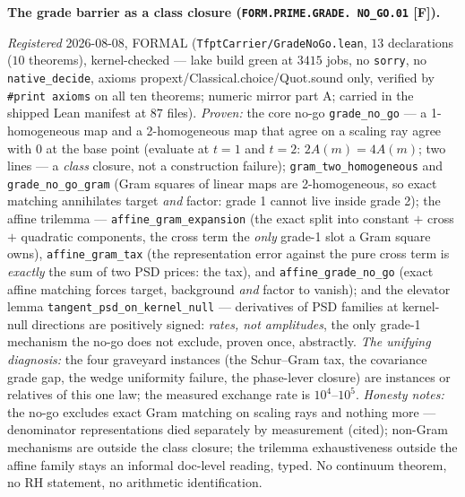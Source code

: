 \documentclass[11pt,a4paper]{article}
\begin{document}
\par\smallskip\noindent\textbf{The grade barrier as a class
closure (\texttt{FORM.PRIME.\allowbreak GRADE.\allowbreak
NO\_GO.01} [F]).}
{\sloppy
\emph{Registered} 2026-08-08, FORMAL
(\texttt{TfptCarrier/GradeNoGo.lean}, $13$ declarations ($10$
theorems), kernel-checked --- lake build green at $3415$ jobs,
no \texttt{sorry}, no \texttt{native\_decide}, axioms
propext/Classical.choice/Quot.sound only, verified by
\texttt{\#print axioms} on all ten theorems; numeric mirror
 part A; carried in the
shipped Lean manifest at $87$ files).  \emph{Proven:} the core
no-go \texttt{grade\_no\_go} --- a 1-homogeneous map and a
2-homogeneous map that agree on a scaling ray agree with $0$ at
the base point (evaluate at $t = 1$ and $t = 2$: $2A(m) =
4A(m)$; two lines --- a \emph{class} closure, not a
construction failure); \texttt{gram\_two\_homogeneous} and
\texttt{grade\_no\_go\_gram} (Gram squares of linear maps are
2-homogeneous, so exact matching annihilates target \emph{and}
factor: grade 1 cannot live inside grade 2); the affine
trilemma --- \texttt{affine\_gram\_expansion} (the exact split
into constant $+$ cross $+$ quadratic components, the cross
term the \emph{only} grade-1 slot a Gram square owns),
\texttt{affine\_gram\_tax} (the representation error against
the pure cross term is \emph{exactly} the sum of two PSD
prices: the tax), and \texttt{affine\_grade\_no\_go} (exact
affine matching forces target, background \emph{and} factor to
vanish); and the elevator lemma
\texttt{tangent\_psd\_on\_kernel\_null} --- derivatives of PSD
families at kernel-null directions are positively signed:
\emph{rates, not amplitudes}, the only grade-1 mechanism the
no-go does not exclude, proven once, abstractly.  \emph{The
unifying diagnosis:} the four graveyard instances (the
Schur--Gram tax, the covariance grade gap, the wedge uniformity
failure, the phase-lever closure) are instances or relatives of
this one law; the measured exchange rate is $10^4$--$10^5$.
\emph{Honesty notes:} the no-go excludes exact Gram matching on
scaling rays and nothing more --- denominator representations
died separately by measurement (cited); non-Gram mechanisms are
outside the class closure; the trilemma exhaustiveness outside
the affine family stays an informal doc-level reading, typed.
No continuum theorem, no RH statement, no arithmetic
identification.\par}
\end{document}
